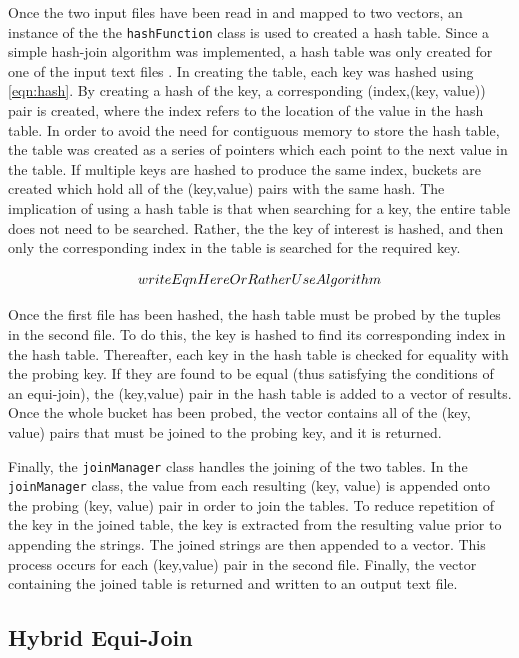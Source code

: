 \documentclass[10pt,twocolumn]{witseiepaper}
\begin{document}
Once the two input files have been read in and mapped to two vectors, an instance of the the \texttt{hashFunction} class is used to created a hash table. Since a simple hash-join algorithm was implemented, a hash table was only created for one of the input text files \cite{evaluating4JoinAlgorithms}. In creating the table, each key was hashed using \ref{eqn:hash}. By creating a hash of the key, a corresponding (index,(key, value)) pair is created, where the index refers to the location of the value in the hash table. In order to avoid the need for contiguous memory to store the hash table, the table was created as a series of pointers which each point to the next value in the table. If multiple keys are hashed to produce the same index, buckets are created which hold all of the (key,value) pairs with the same hash. The implication of using a hash table is that when searching for a key, the entire table does not need to be searched. Rather, the the key of interest is hashed, and then only the corresponding index in the table is searched for the required key.

\begin{equation}
 writeEqnHereOrRatherUseAlgorithm\\
\label{eqn:hash}
\end{equation}

Once the first file has been hashed, the hash table must be probed by the tuples in the second file. To do this, the key is hashed to find its corresponding index in the hash table. Thereafter, each key in the hash table is checked for equality with the probing key. If they are found to be equal (thus satisfying the conditions of an equi-join), the (key,value) pair in the hash table is added to a vector of results. Once the whole bucket has been probed, the vector contains all of the (key, value) pairs that must be joined to the probing key, and it is returned.

Finally, the \texttt{joinManager} class handles the joining of the two tables. In the \texttt{joinManager} class, the value from each resulting (key, value) is appended onto the probing (key, value) pair in order to join the tables. To reduce repetition of the key in the joined table, the key is extracted from the resulting value prior to appending the strings. The joined strings are then appended to a vector. This process occurs for each (key,value) pair in the second file. Finally, the vector containing the joined table is returned and written to an output text file.

\subsection{Hybrid Equi-Join}
\end{document}
